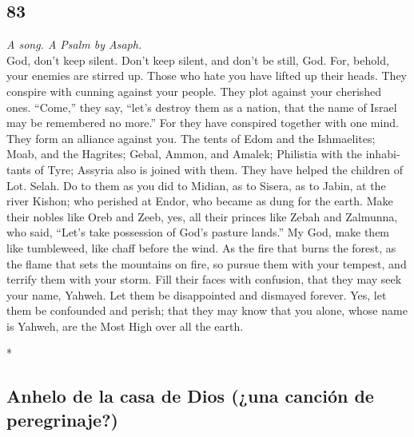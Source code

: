 \begin{paracol}{2}
\switchcolumn
\begin{otherlanguage}{english}

\hypertarget{section-165}{%
\section{83}\label{section-165}}

\emph{A song. A Psalm by Asaph.}\\
 God, don't keep silent. Don't keep silent, and don't be
still, God.  For, behold, your enemies are stirred up.
Those who hate you have lifted up their heads.  They
conspire with cunning against your people. They plot against your
cherished ones.  ``Come,'' they say, ``let's destroy them
as a nation, that the name of Israel may be remembered no more.''
 For they have conspired together with one mind. They form
an alliance against you.  The tents of Edom and the
Ishmaelites; Moab, and the Hagrites;  Gebal, Ammon, and
Amalek; Philistia with the inhabitants of Tyre;  Assyria
also is joined with them. They have helped the children of Lot. Selah.
 Do to them as you did to Midian, as to Sisera, as to
Jabin, at the river Kishon;  who perished at Endor, who
became as dung for the earth.  Make their nobles like
Oreb and Zeeb, yes, all their princes like Zebah and Zalmunna,
 who said, ``Let's take possession of God's pasture
lands.''  My God, make them like tumbleweed, like chaff
before the wind.  As the fire that burns the forest, as
the flame that sets the mountains on fire,  so pursue
them with your tempest, and terrify them with your storm.
 Fill their faces with confusion, that they may seek your
name, Yahweh.  Let them be disappointed and dismayed
forever. Yes, let them be confounded and perish;  that
they may know that you alone, whose name is Yahweh, are the Most High
over all the earth.

\end{otherlanguage}

\switchcolumn[0]*

\hypertarget{anhelo-de-la-casa-de-dios-una-canciuxf3n-de-peregrinaje}{%
\subsection{Anhelo de la casa de Dios (¿una canción de
peregrinaje?)}\label{anhelo-de-la-casa-de-dios-una-canciuxf3n-de-peregrinaje}}


\end{paracol}
